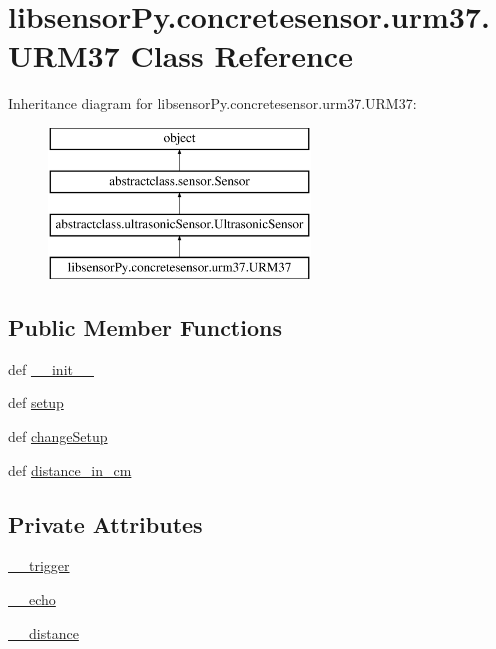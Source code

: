 \hypertarget{classlibsensorPy_1_1concretesensor_1_1urm37_1_1URM37}{}\section{libsensor\+Py.\+concretesensor.\+urm37.\+U\+R\+M37 Class Reference}
\label{classlibsensorPy_1_1concretesensor_1_1urm37_1_1URM37}
Inheritance diagram for libsensor\+Py.\+concretesensor.\+urm37.\+U\+R\+M37\+:\begin{figure}[H]
\begin{center}
\leavevmode
\includegraphics[height=4.000000cm]{classlibsensorPy_1_1concretesensor_1_1urm37_1_1URM37}
\end{center}
\end{figure}
\subsection*{Public Member Functions}
\begin{DoxyCompactItemize}
\item 
def \hyperlink{classlibsensorPy_1_1concretesensor_1_1urm37_1_1URM37_af70dea162db3d5b65dade18b51ee8e78}{\+\_\+\+\_\+init\+\_\+\+\_\+}
\item 
def \hyperlink{classlibsensorPy_1_1concretesensor_1_1urm37_1_1URM37_a56e493a64da260be32b20e5130ed6048}{setup}
\item 
def \hyperlink{classlibsensorPy_1_1concretesensor_1_1urm37_1_1URM37_aa8c7761564eabf3910bb23e6c876e011}{change\+Setup}
\item 
def \hyperlink{classlibsensorPy_1_1concretesensor_1_1urm37_1_1URM37_aa2e810ddd32fc614f3323b875e7c097b}{distance\+\_\+in\+\_\+cm}
\end{DoxyCompactItemize}
\subsection*{Private Attributes}
\begin{DoxyCompactItemize}
\item 
\hyperlink{classlibsensorPy_1_1concretesensor_1_1urm37_1_1URM37_a899807b4f7dd6f38552ff267eb98a27e}{\+\_\+\+\_\+trigger}
\item 
\hyperlink{classlibsensorPy_1_1concretesensor_1_1urm37_1_1URM37_ad5aaa168f38c1f1e825a29f097a96d49}{\+\_\+\+\_\+echo}
\item 
\hyperlink{classlibsensorPy_1_1concretesensor_1_1urm37_1_1URM37_a8e530cc4f94adc305edc24f92c559b37}{\+\_\+\+\_\+distance}
\end{DoxyCompactItemize}


